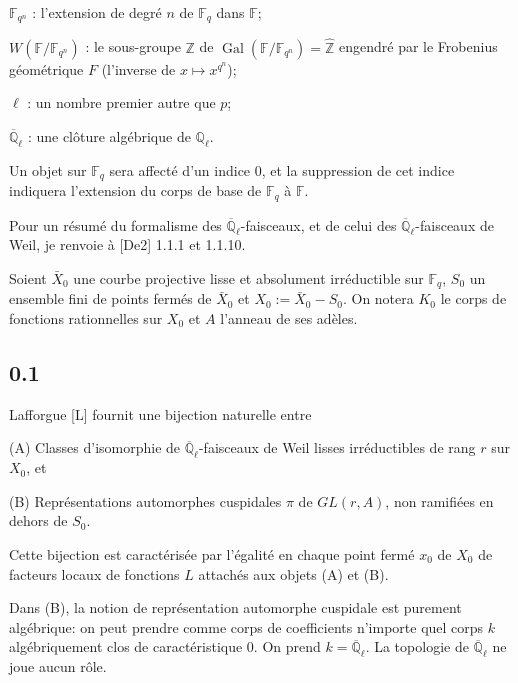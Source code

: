 \documentclass[10pt,a4paper]{article}
\theoremstyle{plain}
\theoremstyle{definition}
\DeclareMathOperator{\Gal}{Gal}
\begin{document}
$\mathbb{F}_{q^n}$ : l'extension de degr\'e $n$ de $\mathbb{F}_q$ dans $\mathbb{F}$;

$W(\mathbb{F}/\mathbb{F}_{q^n})$ : le sous-groupe $\mathbb{Z}$ de $\Gal(\mathbb{F}/\mathbb{F}_{q^n}) = \hat{\mathbb{Z}}$ engendr\'e par le Frobenius g\'eom\'etrique $F$ (l'inverse de $x \mapsto x^{q^n}$);

$\ell$ : un nombre premier autre que $p$;

$\overline{\mathbb{Q}}_\ell$ : une cl\^oture alg\'ebrique de $\mathbb{Q}_\ell$.

Un objet sur $\mathbb{F}_q$ sera affect\'e d'un indice $0$, et la suppression de cet indice indiquera l'extension du corps de base de $\mathbb{F}_q$ \`a $\mathbb{F}$.

Pour un r\'esum\'e du formalisme des $\overline{\mathbb{Q}}_\ell$-faisceaux, et de celui des $\overline{\mathbb{Q}}_\ell$-faisceaux de Weil, je renvoie \`a [De2] 1.1.1 et 1.1.10.

Soient $\bar{X}_0$ une courbe projective lisse et absolument irr\'eductible sur $\mathbb{F}_q$, $S_0$ un ensemble fini de points ferm\'es de $\bar{X}_0$ et $X_0 := \bar{X}_0 - S_0$. On notera $K_0$ le corps de fonctions rationnelles sur $X_0$ et $A$ l'anneau de ses ad\`eles.

\subsection*{0.1}

Lafforgue [L] fournit une bijection naturelle entre

(A) Classes d'isomorphie de $\overline{\mathbb{Q}}_\ell$-faisceaux de Weil lisses irr\'eductibles de rang $r$ sur $X_0$, et

(B) Repr\'esentations automorphes cuspidales $\pi$ de $GL(r,A)$, non ramifi\'ees en dehors de $S_0$.

Cette bijection est caract\'eris\'ee par l'\'egalit\'e en chaque point ferm\'e $x_0$ de $X_0$ de facteurs locaux de fonctions $L$ attach\'es aux objets (A) et (B).

Dans (B), la notion de repr\'esentation automorphe cuspidale est purement alg\'ebrique: on peut prendre comme corps de coefficients n'importe quel corps $k$ alg\'ebriquement clos de caract\'eristique $0$. On prend $k = \overline{\mathbb{Q}}_\ell$. La topologie de $\overline{\mathbb{Q}}_\ell$ ne joue aucun r\^ole.
\end{document}
